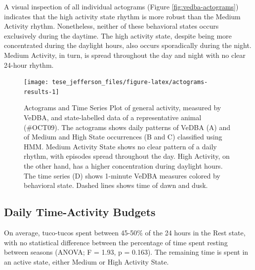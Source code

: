 \documentclass[english,msc,numbers,hidelinks]{coppe}
\begin{document}
  A visual inspection of all individual actograms (Figure \ref{fig:vedba-actograms}) indicates that the high activity state rhythm is more robust than the Medium Activity rhythm. Nonetheless, neither of these behavioral states occurs exclusively during the daytime. The high activity state, despite being more concentrated during the daylight hours, also occurs sporadically during the night. Medium Activity, in turn, is spread throughout the day and night with no clear 24-hour rhythm.
  \newline
  \begin{figure}[H]

  {\centering \texttt{[image: tese\_jefferson\_files/figure-latex/actograms-results-1]} 

  }

  \caption{Actograms and Time Series Plot of general activity, measured by VeDBA, and state-labelled data of a representative animal (\#OCT09). The actograms shows daily patterns of VeDBA (A) and of Medium and High State occurrences (B and C) classified using HMM. Medium Activity State shows no clear pattern of a daily rhythm, with episodes spread throughout the day. High Activity, on the other hand, has a higher concentration during daylight hours. The time series (D) shows 1-minute VeDBA measures colored by behavioral state. Dashed lines shows time of dawn and dusk.}\label{fig:actograms-results}
  \end{figure}
  \clearpage

  \hypertarget{daily-time-activity-budgets}{%
  \subsection{Daily Time-Activity Budgets}\label{daily-time-activity-budgets}}

  On average, tuco-tucos spent between 45-50\% of the 24 hours in the Rest state, with no statistical difference between the percentage of time spent resting between seasons (ANOVA; F = 1.93, p = 0.163). The remaining time is spent in an active state, either Medium or High Activity State.
\end{document}

